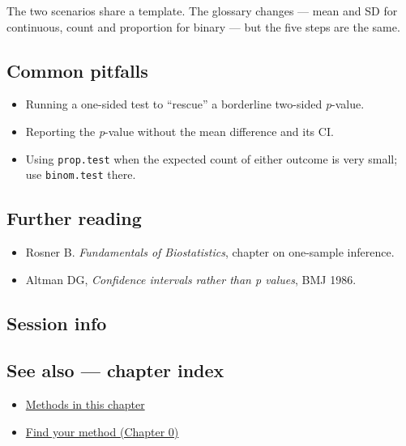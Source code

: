 \documentclass[
]{article}
\newenvironment{Shaded}{\begin{snugshade}}{\end{snugshade}}
\providecommand{\tightlist}{%
  \setlength{\itemsep}{0pt}\setlength{\parskip}{0pt}}
\begin{document}
The two scenarios share a template. The glossary changes --- mean and SD
for continuous, count and proportion for binary --- but the five steps
are the same.

\subsection{Common pitfalls}\label{common-pitfalls}

\begin{itemize}
\tightlist
\item
  Running a one-sided test to ``rescue'' a borderline two-sided
  \emph{p}-value.
\item
  Reporting the \emph{p}-value without the mean difference and its CI.
\item
  Using \texttt{prop.test} when the expected count of either outcome is
  very small; use \texttt{binom.test} there.
\end{itemize}

\subsection{Further reading}\label{further-reading}

\begin{itemize}
\tightlist
\item
  Rosner B. \emph{Fundamentals of Biostatistics}, chapter on one-sample
  inference.
\item
  Altman DG, \emph{Confidence intervals rather than p values}, BMJ 1986.
\end{itemize}

\subsection{Session info}\label{session-info}

\begin{Shaded}
\begin{Highlighting}[]

\end{Highlighting}
\end{Shaded}

\subsection{See also --- chapter index}\label{see-also-chapter-index}

\begin{itemize}
\tightlist
\item
  \href{../index.Rmd}{Methods in this chapter}
\item
  \href{../../../ch00-find-your-method.Rmd}{Find your method (Chapter
  0)}
\end{itemize}
\end{document}
